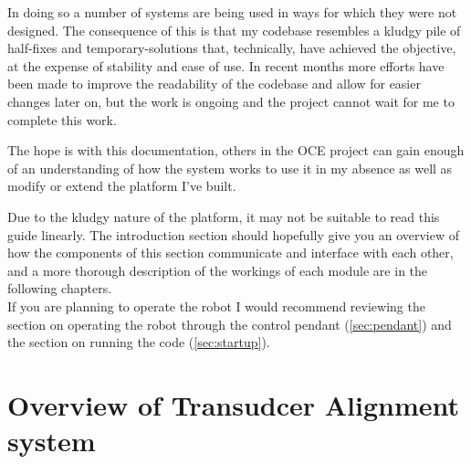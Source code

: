 \documentclass[11pt]{article}
\begin{document}
In doing so a number of systems are being used in ways for which they were not designed. The consequence of this is that my codebase resembles a kludgy pile of half-fixes and temporary-solutions that, technically, have achieved the objective, at the expense of stability and ease of use.
In recent months more efforts have been made to improve the readability of the codebase and allow for easier changes later on, but the work is ongoing and the project cannot wait for me to complete this work.

The hope is with this documentation, others in the OCE project can gain enough of an understanding of how the system works to use it in my absence as well as modify or extend the platform I've built.

Due to the kludgy nature of the platform, it may not be suitable to read this guide linearly. The introduction section should hopefully give you an overview of how the components of this section communicate and interface with each other, and a more thorough description of the workings of each module are in the following chapters.\\
If you are planning to operate the robot I would recommend reviewing the section on operating the robot through the control pendant (\autoref{sec:pendant}) and the section on running the code (\autoref{sec:startup}).

\section{Overview of Transudcer Alignment system}
\begin{center}
\end{center}
\end{document}
